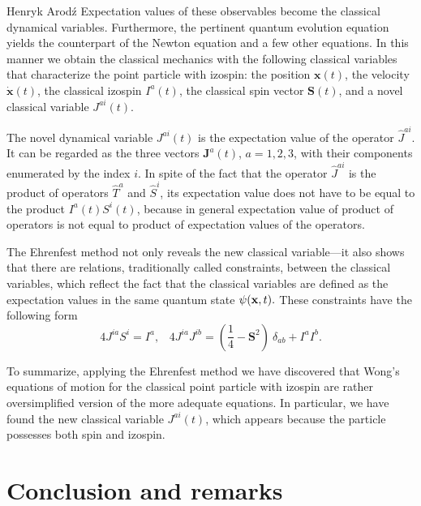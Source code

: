 \begin{artengenv}{Henryk Arod\'z}
Expectation values of these observables become the classical dynamical variables. Furthermore, the pertinent quantum evolution equation yields the counterpart of the Newton equation and a few other equations. In this manner we obtain the classical mechanics with the following classical variables that characterize the point particle with izospin: the position $\mathbf{x}(t)$, the velocity $\dot{\mathbf{x}}(t)$, the classical izospin $I^a(t)$, the classical spin vector $\mathbf{S}(t)$, and a novel classical variable 
 $ J^{ai}(t)$. 
 
The novel dynamical variable $J^{ai}(t)$ is the expectation value of the operator $\hat{J}^{ai} $. It can be regarded as the three vectors $\mathbf{J}^a(t)$, \mbox{$a=1,2,3$}, with their components enumerated by the index $i$. In spite of the fact that the operator $\hat{J}^{ai}$ is the product of operators 
$\hat{T}^a$ and $\hat{S}^i$, its expectation value does not have to be equal to the product $I^a(t) S^i(t)$, because in general expectation value of product of operators is not equal to product of expectation values of the operators. 

The Ehrenfest method not only reveals the new classical variable---it also shows that there are relations, traditionally called constraints, between the classical variables, which reflect the fact that the classical variables are defined as the expectation values in the same quantum state $\psi({\bf x}, t).$ These constraints have the following form
\[ 4 J^{i a} S^i = I^a, \;\;\; 4 J^{ia} J^{ib} = (\frac{1}{4} - \mathbf{S}^2) \: \delta_{ab} + I^a I^b. \]




To summarize, applying the Ehrenfest method we have discovered that Wong's equations of motion for the classical point particle with izospin are rather oversimplified version of the more adequate equations. In particular, we have found the new classical variable $J^{ai}(t)$, which appears because the particle possesses both spin and izospin. 








\section{Conclusion and remarks} 


\end{artengenv}
